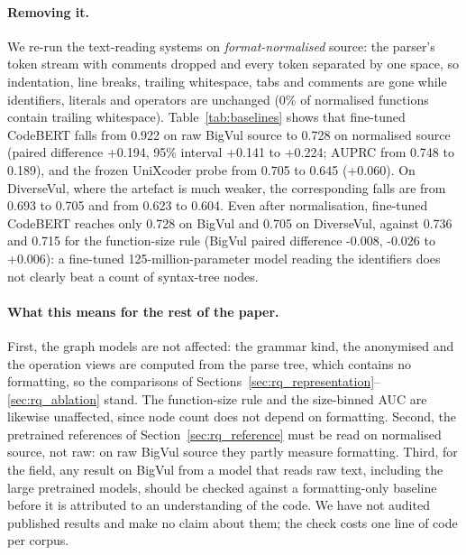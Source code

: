\documentclass[pdflatex,sn-basic]{sn-jnl}
\theoremstyle{thmstyleone}%
\newcommand{\numartBvTrailNormAny}{0}
\newcommand{\numbvSizeAuc}{0.736}
\newcommand{\numdvSizeAuc}{0.715}
\newcommand{\rBvLinevulAuc}{0.922}
\newcommand{\rBvLinevulAuprc}{0.748}
\newcommand{\rBvLinevulNormAuc}{0.728}
\newcommand{\rBvLinevulNormAuprc}{0.189}
\newcommand{\rBvUnixAuc}{0.705}
\newcommand{\rBvUnixNormAuc}{0.645}
\newcommand{\rDvLinevulAuc}{0.693}
\newcommand{\rDvLinevulNormAuc}{0.705}
\newcommand{\rDvUnixAuc}{0.623}
\newcommand{\rDvUnixNormAuc}{0.604}
\newcommand{\xBvLinevulNormVSizeD}{-0.008}
\newcommand{\xBvLinevulNormVSizeHi}{+0.006}
\newcommand{\xBvLinevulNormVSizeLo}{-0.026}
\newcommand{\xBvLinevulVLinevulNormD}{+0.194}
\newcommand{\xBvLinevulVLinevulNormHi}{+0.224}
\newcommand{\xBvLinevulVLinevulNormLo}{+0.141}
\newcommand{\xBvUnixVUnixNormD}{+0.060}
\begin{document}
\paragraph{Removing it.} We re-run the text-reading systems on
\emph{format-normalised} source: the parser's token stream with comments
dropped and every token separated by one space, so indentation, line breaks,
trailing whitespace, tabs and comments are gone while identifiers, literals and
operators are unchanged (\numartBvTrailNormAny\% of normalised functions contain
trailing whitespace). Table~\ref{tab:baselines} shows that fine-tuned CodeBERT
falls from \rBvLinevulAuc{} on raw BigVul source to \rBvLinevulNormAuc{} on
normalised source (paired difference \xBvLinevulVLinevulNormD{}, 95\% interval
\xBvLinevulVLinevulNormLo{} to \xBvLinevulVLinevulNormHi{}; AUPRC from
\rBvLinevulAuprc{} to \rBvLinevulNormAuprc{}), and the frozen UniXcoder probe from
\rBvUnixAuc{} to \rBvUnixNormAuc{} (\xBvUnixVUnixNormD{}). On DiverseVul, where the
artefact is much weaker, the corresponding falls are from \rDvLinevulAuc{} to
\rDvLinevulNormAuc{} and from \rDvUnixAuc{} to \rDvUnixNormAuc{}. Even after
normalisation, fine-tuned CodeBERT reaches only \rBvLinevulNormAuc{} on BigVul
and \rDvLinevulNormAuc{} on DiverseVul, against \numbvSizeAuc{} and
\numdvSizeAuc{} for the function-size rule (BigVul paired difference
\xBvLinevulNormVSizeD{}, \xBvLinevulNormVSizeLo{} to \xBvLinevulNormVSizeHi{}): a
fine-tuned 125-million-parameter model reading the identifiers does not clearly
beat a count of syntax-tree nodes.

\paragraph{What this means for the rest of the paper.} First, the graph models
are not affected: the grammar kind, the anonymised and the operation views are
computed from the parse tree, which contains no formatting, so the comparisons of
Sections~\ref{sec:rq_representation}--\ref{sec:rq_ablation} stand. The
function-size rule and the size-binned AUC are likewise unaffected, since node
count does not depend on formatting. Second, the pretrained references of
Section~\ref{sec:rq_reference} must be read on normalised source, not raw: on
raw BigVul source they partly measure formatting. Third, for the field, any
result on BigVul from a model that reads raw text, including the large
pretrained models, should be checked against a formatting-only baseline before it
is attributed to an understanding of the code. We have not audited published
results and make no claim about them; the check costs one line of code per
corpus.
\end{document}

